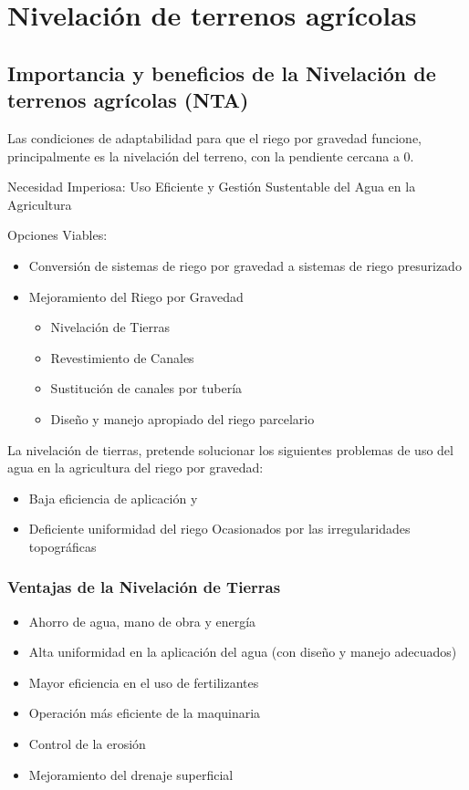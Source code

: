 \section{Nivelación de terrenos agrícolas}
\subsection{Importancia y beneficios de la Nivelación de terrenos agrícolas (NTA)}

Las condiciones de adaptabilidad para que el riego por gravedad funcione, principalmente es la nivelación del terreno, con la pendiente cercana a 0.

Necesidad Imperiosa: Uso Eficiente y Gestión Sustentable del Agua en la Agricultura

Opciones Viables:
\begin{itemize}
    \item Conversión de sistemas de riego por gravedad a sistemas de riego presurizado
    \item Mejoramiento del Riego por Gravedad \begin{itemize}
        \item Nivelación de Tierras
        \item Revestimiento de Canales
        \item Sustitución de canales por tubería
        \item Diseño y manejo apropiado del riego parcelario
    \end{itemize}
\end{itemize}

La nivelación de tierras, pretende solucionar los siguientes problemas de uso del agua en la agricultura del riego por gravedad:
\begin{itemize}
    \item Baja eficiencia de aplicación y
    \item Deficiente uniformidad del riego Ocasionados por las irregularidades topográficas
\end{itemize}
\subsubsection{Ventajas de la Nivelación de Tierras}
\begin{itemize}
    \item Ahorro de agua, mano de obra y energía
    \item Alta uniformidad en la aplicación del agua (con diseño y manejo adecuados)
    \item Mayor eficiencia en el uso de fertilizantes
    \item Operación más eficiente de la maquinaria
    \item Control de la erosión
    \item Mejoramiento del drenaje superficial
\end{itemize}
